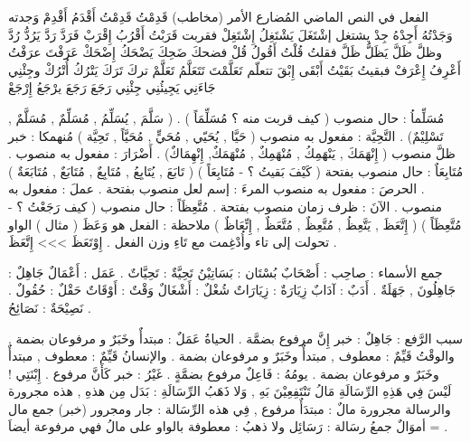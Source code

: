 \documentclass[a4paper]{article}
\begin{document}
\begin{flushright}
الفعل في النص      الماضي    المُضارع      الأمر     (مخاطب)
      قَدِمْتُ          قَدِمْتُ     أَقْدَمُ             أَقْدِمْ
     وَجدته          وَجَدْتُهُ    أَجِدْهُ             جِدْ
      يشتغل            إشْتَغَلَ      يَشْتَغِلُ             إِشْتَغِلْ
      فقربت            قَرَبْتُ       أَقْرُبُ             إِقْرَبْ
      فَرَدَّ               رَدَّ          يَرُدُّ               رُدَّ
      وظلَّ              ظَلَّ         يَظَلُّ              ظَلَّ
      فقلتُ              قُلْتُ         أَقُولُ              قُلْ
      فضحكَ           ضَحِكَ       يَضْحَكُ           إِضْحَكْ
      عَرَفْتَ         عرَفْتُ         أَعْرِفُ            إِعْرَفْ
      فبقيتُ             بَقَيْتُ        أَبْقَى              إِبْقَ
تتعلّم              تَعَلَّمْتَ      تَتَعَلَّمُ              تَعَلَّمْ
تركَ              تَرَكَ        يَتْرُكُ             أُتْرُكْ
وجِئْنِي            جَاءَنِي      يَجِيئُنِي            جِئْنِي
رَجَعَ              رَجَعَ        يرْجَعُ             إِرْجَعْ
 
 
مُسَلِّماُ : حال منصوب ( كيف قربت منه ؟ مُسَلِّمَاً ) .
      ( سَلَّمَ , يُسَلِّمُ , مُسَلِّمٌ , مُسَلَّمٌ , تَسْلِيْمٌ) .
التَّحِيَّة : مفعول به منصوب ( حَيَّا , يُحَيّي , مُحَيٍّ , مُحَيَّاً , تَحِيَّة )
مُنهمكا : خبر ظلَّ منصوب ( إِنْهَمَكَ , يَنْهَمِكُ , مُنْهَمِكٌ , مُنْهَمَكٌ, إِنْهِمَاكٌ) .
أَضْرَارَ : مفعول به منصوب .
مُتَابِعَاٌ : حال منصوب بفتحة ( كَيْفَ بَقيتُ ؟ - مُتَابِعَاً )
      ( تَابَعَ , يُتَابِعُ , مُتَابِعٌ , مُتَابَعٌ , مُتَابَعَةٌ ) .
الحرصَ : مفعول به منصوب
المرءَ : إسم لعل منصوب بفتحة .
عملَ : مفعول به منصوب .
الآنَ : ظرف زمان منصوب بفتحة .
مُتَّعِظَاً : حال منصوب ( كيف رَجَعْتُ ؟ - مُتَّعِظَاً )
      ( إِتَّعَظَ , يَتَّعِظُ , مُتَّعِظٌ , مُتَّعَظٌ , إِتِّعَاظٌ )
      ملاحظة : الفعل هو وَعَظَ ( مثال ) الواو تحولت إلى تاء وأُدْغِمت مع
                  تَاءِ وزن الفعل . إِوْتَعَظَ >>> إِتَّعَظَ .
 
جمع الأسماء :
صاحِب : أَصْحَابٌ
بُسْتَان : بَسَاتِيْنُ
تَحِيَّةٌ : تَحِيَّاتٌ .
عَمَل : أَعْمَالٌ
جَاهِلٌ : جَاهِلُونَ , جَهَلَةٌ .
أَدَبٌ : آدَابٌ   
زِيَارَةٌ : زِيَارَاتٌ
شُغْلٌ : أَشْغَالٌ
وَقْتٌ : أَوْقَاتٌ
حَقْلٌ : حُقُولٌ .     
نَصِيْحَةٌ : نَصَائِحُ .
 
سبب الرَّفع :
جَاهِلٌ : خبر إِنَّ مرفوع بضمَّة .
الحياةُ عَمَلٌ : مبتدأٌ وخَبَرٌ و مرفوعان بضمة .
والوقْتُ قَيِّمٌ : معطوف , مبتدأٌ وخَبَرٌ و مرفوعان بضمة .
والإنسانُ قَيِّمٌ : معطوف , مبتدأٌ وخَبَرٌ و مرفوعان بضمة .
يومُهُ : فَاعِلٌ مرفوع بضمَّةٍ .
غَيْرُ : خبر كَأَنَّ مرفوع .
إِبْنَتِي ! لَيْسَ فِي هَذِهِ الرِّسَالَةِ مَالُ تَنْتَفِعِيْنَ بَهِ , وَلا ذَهَبُ
الرِّسَالَةِ : بَدَل مِن هذهِ , هذه مجرورة والرسالة مجرورة
مالٌ : مبتدَأٌ مرفوع , فِي هذه الرِّسَالة : جار ومجرور (خبر)
      جمع مال = أموَالٌ       جمعُ رسَالة : رَسَائِل
ولا ذهبُ : معطوفة بالواو على مالُ فهي مرفوعة أيضاَ .
 


\end{flushright}
\end{document}
